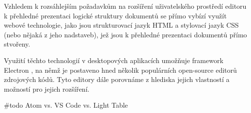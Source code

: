 Vzhledem k rozsáhlejším požadavkům na rozšíření uživatelského prostředí editoru k přehledné prezentaci logické struktury
dokumentů se přímo vybízí využít webové technologie, jako jsou strukturovací jazyk HTML a stylovací jazyk CSS (nebo
nějaká z jeho nadstaveb), jež jsou k přehledné prezentaci dokumentů přímo stvořeny. \cite{w3-html-css}

Využití těchto technologií v desktopových aplikacích umožňuje framework Electron \cite{electron-docs}, na němž je
postaveno hned několik populárních open-source editorů zdrojových kódů. Tyto editory dále porovnáme z hlediska jejich
vlastností a možností pro jejich rozšíření.

\#todo Atom vs. VS Code vs. Light Table
